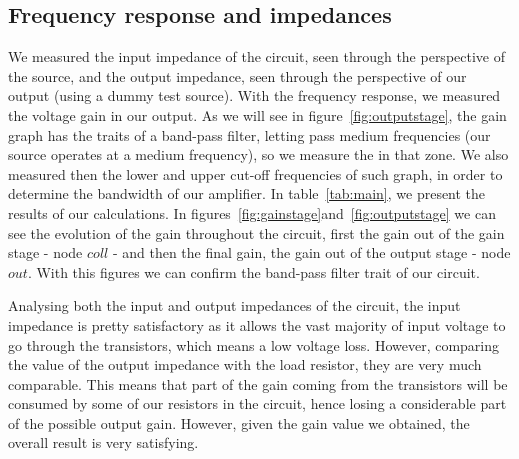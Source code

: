 \subsection{Frequency response and impedances}
We measured the input impedance of the circuit, seen through the perspective of the source, and the output impedance, seen through the perspective of our output (using a dummy test source). With the frequency response, we measured the voltage gain in our output. As we will see in figure~\ref{fig:outputstage}, the gain graph has the traits of a band-pass filter, letting pass medium frequencies (our source operates at a medium frequency), so we measure the in that zone. We also measured then the lower and upper cut-off frequencies of such graph, in order to determine the bandwidth of our amplifier. In table~\ref{tab:main}, we present the results of our calculations. In figures~\ref{fig:gainstage}and~\ref{fig:outputstage} we can see the evolution of the gain throughout the circuit, first the gain out of the gain stage - node $coll$ - and then the final gain, the gain out of the output stage - node $out$. With this figures we can confirm the band-pass filter trait of our circuit.



Analysing both the input and output impedances of the circuit, the input impedance is pretty satisfactory as it allows the vast majority of input voltage to go through the transistors, which means a low voltage loss. However, comparing the value of the output impedance with the load resistor, they are very much comparable. This means that part of the gain coming from the transistors will be consumed by some of our resistors in the circuit, hence losing a considerable part of the possible output gain. However, given the gain value we obtained, the overall result is very satisfying.



